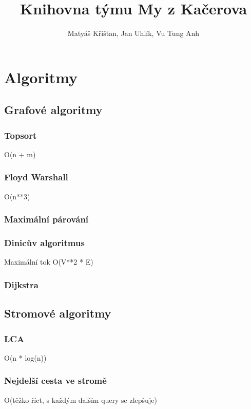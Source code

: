 \documentclass[10pt, a4paper, twoside]{article}
\title{Knihovna týmu My z Kačerova}
\author{Matyáš Křišťan, Jan Uhlík, Vu Tung Anh}
\begin{document}
\tableofcontents

\section{Algoritmy}
\subsection{Grafové algoritmy}

\subsubsection{Topsort}
O(n + m)


\subsubsection{Floyd Warshall}
O(n**3)


\subsubsection{Maximální párování}


\subsubsection{Dinicův algoritmus}
Maximální tok O(V**2 * E)


\subsubsection{Dijkstra}


\subsection{Stromové algoritmy}
\subsubsection{LCA}
O(n * log(n))


\subsubsection{Nejdelší cesta ve stromě}
O(těžko říct, s každým dalším query se zlepšuje)

\end{document}
